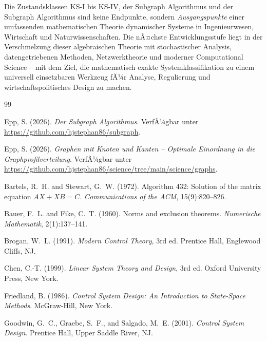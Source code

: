 ﻿\documentclass[12pt, a4paper, titlepage]{report}
\theoremstyle{definition}
\theoremstyle{remark}
\begin{document}
Die Zustandsklassen KS-I bis KS-IV, der Subgraph Algorithmus und der Subgraph Algorithmus
sind keine Endpunkte, sondern \emph{Ausgangspunkte} einer umfassenden mathematischen
Theorie dynamischer Systeme in Ingenieurwesen, Wirtschaft und Naturwissenschaften.
Die nÃ¤chste Entwicklungsstufe liegt in der Verschmelzung dieser algebraischen Theorie
mit stochastischer Analysis, datengetriebenen Methoden, Netzwerktheorie und moderner
Computational Science -- mit dem Ziel, die mathematisch exakte Systemklassifikation
zu einem universell einsetzbaren Werkzeug fÃ¼r Analyse, Regulierung und
wirtschaftspolitisches Design zu machen.


\begin{thebibliography}{99}

Epp, S. (2026).
\newblock \textit{Der Subgraph Algorithmus}. VerfÃ¼gbar unter \url{https://github.com/hjstephan86/subgraph}.

Epp, S. (2026).
\newblock \textit{Graphen mit Knoten und Kanten -- Optimale Einordnung in die
  Graphprofilverteilung}. VerfÃ¼gbar unter \url{https://github.com/hjstephan86/science/tree/main/science/graphs}.

Bartels, R.~H. and Stewart, G.~W. (1972).
\newblock Algorithm 432: Solution of the matrix equation $AX + XB = C$.
\newblock \textit{Communications of the ACM}, 15(9):820--826.

Bauer, F.~L. and Fike, C.~T. (1960).
\newblock Norms and exclusion theorems.
\newblock \textit{Numerische Mathematik}, 2(1):137--141.

Brogan, W.~L. (1991).
\newblock \textit{Modern Control Theory}, 3rd ed.
\newblock Prentice Hall, Englewood Cliffs, NJ.

Chen, C.-T. (1999).
\newblock \textit{Linear System Theory and Design}, 3rd ed.
\newblock Oxford University Press, New York.

Friedland, B. (1986).
\newblock \textit{Control System Design: An Introduction to State-Space Methods}.
\newblock McGraw-Hill, New York.

Goodwin, G.~C., Graebe, S.~F., and Salgado, M.~E. (2001).
\newblock \textit{Control System Design}.
\newblock Prentice Hall, Upper Saddle River, NJ.


\end{thebibliography}
\end{document}
